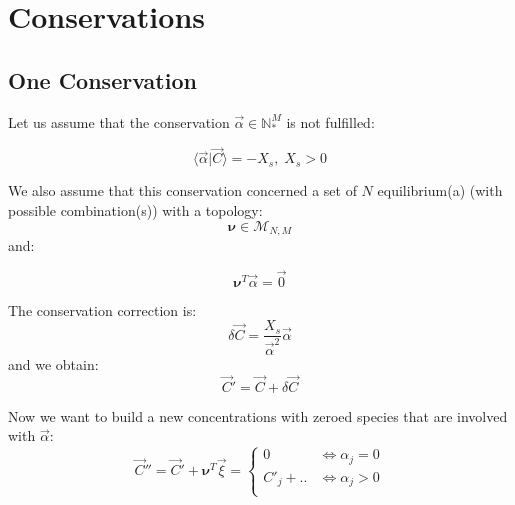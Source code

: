 \documentclass[aps,12pt]{revtex4}
\begin{document}
\section{Conservations}

\subsection{One Conservation}

Let us assume that the conservation $\vec \alpha \in \mathbb{N}_\ast^M$ is not fulfilled:

\begin{equation}
	\langle \vec \alpha \vert \vec C \rangle = - X_s, \; X_s > 0
\end{equation}

We also assume that this conservation concerned a set of $N$ equilibrium(a) (with possible combination(s))
with a topology:
\begin{equation}
	\bm \nu \in \mathcal{M}_{N,M}  \end{equation}
and:

\begin{equation}
	 \bm \nu ^T \vec \alpha = \vec 0
\end{equation}

The conservation correction is:
\begin{equation}
	\delta \vec C =  \dfrac{X_s}{\vec\alpha^2} \vec \alpha
\end{equation}
and we obtain:
\begin{equation}
	\vec C ' = \vec C + \delta \vec{C}
\end{equation}
	
Now we want to build a new concentrations with zeroed species
that are involved with $\vec \alpha$:
\begin{equation}
	\vec C '' = \vec C' + \bm\nu^T \vec \xi = 
	\left\lbrace
	\begin{array}{rl}
	0 & \iff \alpha_j=0\\
	C'_j + .. & \iff \alpha_j>0\\
	 \end{array}
	\right.
\end{equation}

 
\end{document}
